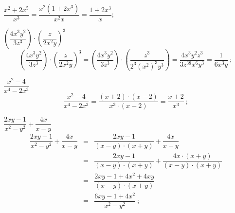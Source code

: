  \begin{exem}
  $\dfrac{x^2+2x^5}{x^3}= \dfrac{x^2(1+2x^3)}{x^2 x}= \dfrac{1+2x^3}{x}$;
 \end{exem}
 
 \begin{exem}
  $\left(\dfrac{4x^3y^2}{3z^3}\right) \cdot \left(\dfrac{z}{2x^2y} \right)^3$
\begin{equation*}
\left(\dfrac{4x^3y^2}{3z^3}\right) \cdot \left(\dfrac{z}{2x^2y} \right)^3 = \left(\dfrac{4x^3y^2}{3z^3}\right) \cdot \left(\dfrac{z^3}{2^3(x^2)^3y^3} \right)= \dfrac{4x^3y^2z^3}{3z^38x^6y^3}= \dfrac{1}{6x^3y} \ ;
\end{equation*}
  \end{exem}
 
 \begin{exem}
 $\dfrac{x^2 - 4}{x^4 - 2x^3}$
\begin{equation*}
\dfrac{x^2 - 4}{x^4 - 2x^3}= \dfrac{(x+2) \cdot (x-2)}{x^3 \cdot (x - 2)}= \dfrac{x+2}{x^3} \ ; 
\end{equation*}
  \end{exem}

  \begin{exem}
  $\dfrac{2xy-1}{x^2 - y^2} + \dfrac{4x}{x-y}$
  \begin{eqnarray*}
   \dfrac{2xy-1}{x^2 - y^2} + \dfrac{4x}{x-y} &=& \dfrac{2xy-1}{(x-y)\cdot (x+y)} + \dfrac{4x}{x-y} \\
   &=& \dfrac{2xy-1}{(x-y)\cdot (x+y)} + \dfrac{4x \cdot (x+y)}{(x-y)\cdot (x+y)} \\
   &=& \dfrac{2xy - 1 + 4x^2 + 4xy}{(x-y)\cdot (x+y)} \\
   &=& \dfrac{6xy - 1 + 4x^2}{x^2 - y^2} \ ;
  \end{eqnarray*}
  \end{exem}
  
